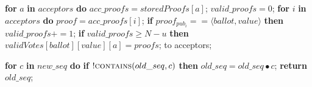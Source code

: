\begin{algorithm}
\begin{algorithmic}[1]
		\State
		\State \hspace{\algorithmicindent} \textbf{for} $a$ \textbf{in} $acceptors$ \textbf{do}
		\State \hspace{\algorithmicindent}\hspace{\algorithmicindent} $acc\_proofs = storedProofs[a]$;
		\State \hspace{\algorithmicindent}\hspace{\algorithmicindent} $valid\_proofs = 0$;
		\State \hspace{\algorithmicindent}\hspace{\algorithmicindent} \textbf{for} $i$ \textbf{in} $acceptors$ \textbf{do}
		\State \hspace{\algorithmicindent}\hspace{\algorithmicindent}\hspace{\algorithmicindent} $proof = acc\_proofs[i]$;
		\State \hspace{\algorithmicindent}\hspace{\algorithmicindent}\hspace{\algorithmicindent} \textbf{if} $proof_{pub_i} == \langle ballot, value \rangle$ \textbf{then}
		\State \hspace{\algorithmicindent}\hspace{\algorithmicindent}\hspace{\algorithmicindent}\hspace{\algorithmicindent} 
		$valid\_proofs \mathrel{+{=}} 1$;
		\State
		\State \hspace{\algorithmicindent}\hspace{\algorithmicindent} \textbf{if} $valid\_proofs \geq N-u$ \textbf{then}
		\State \hspace{\algorithmicindent}\hspace{\algorithmicindent}\hspace{\algorithmicindent} $validVotes[ballot][value][a] = proofs$;
		\State 		
		\State \hspace{\algorithmicindent}  to acceptors;

		\State		
		\State \textbf{for} $c$ \textbf{in} $new\_seq$ \textbf{do} 
		\State \hspace{\algorithmicindent} \textbf{if} $!\Call{contains}{old\_seq,c}$ \textbf{then}
		\State \hspace{\algorithmicindent}\hspace{\algorithmicindent}\hspace{\algorithmicindent} $old\_seq =  old\_seq \bullet c$;
		\State \textbf{return} $old\_seq$;
		\EndFunction
	\end{algorithmic}
\end{algorithm}

